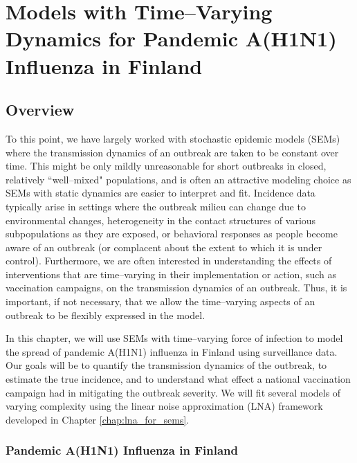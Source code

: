 \chapter{Models with Time--Varying Dynamics for Pandemic A(H1N1) Influenza in Finland}
\label{chap:lna_extensions}

\section{Overview}
\label{sec:lna_extensions_overview}
To this point, we have largely worked with stochastic epidemic models (SEMs) where the transmission dynamics of an outbreak are taken to be constant over time. This might be only mildly unreasonable for short outbreaks in closed, relatively ``well--mixed" populations, and is often an attractive modeling choice as SEMs with static dynamics are easier to interpret and fit. Incidence data typically arise in settings where the outbreak milieu can change due to environmental changes, heterogeneity in the contact structures of various subpopulations as they are exposed, or behavioral responses as people become aware of an outbreak (or complacent about the extent to which it is under control). Furthermore, we are often interested in understanding the effects of interventions that are time--varying in their implementation or action, such as vaccination campaigns, on the transmission dynamics of an outbreak. Thus, it is important, if not necessary, that we allow the time--varying aspects of an outbreak to be flexibly expressed in the model.

In this chapter, we will use SEMs with time--varying force of infection to model the spread of pandemic A(H1N1) influenza in Finland using surveillance data. Our goals will be to quantify the transmission dynamics of the outbreak, to estimate the true incidence, and to understand what effect a national vaccination campaign had in mitigating the outbreak severity. We will fit several models of varying complexity using the linear noise approximation (LNA) framework developed in Chapter \ref{chap:lna_for_sems}.

\subsection{Pandemic A(H1N1) Influenza in Finland}
\label{subsec:flu_description}

